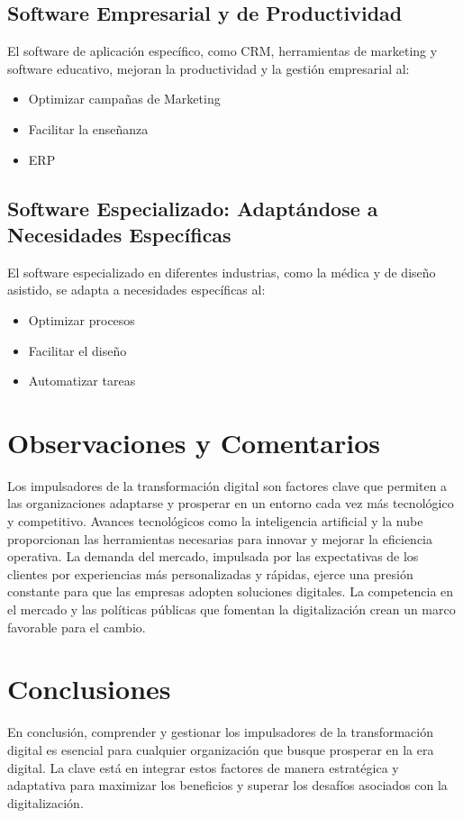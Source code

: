 \documentclass[12pt]{article}
\begin{document}
\subsection*{Software Empresarial y de Productividad}
El software de aplicación específico, como CRM, herramientas de marketing y software educativo, mejoran la productividad y la gestión empresarial al:
\begin{itemize}
\item  Optimizar campañas de Marketing
\item Facilitar la enseñanza
\item  ERP
\end{itemize}


\subsection*{Software Especializado: Adaptándose a Necesidades Específicas}
El software especializado en diferentes industrias, como la médica y de diseño asistido, se adapta a necesidades específicas al:
\begin{itemize}
\item  Optimizar procesos
\item Facilitar el diseño
\item  Automatizar tareas
\end{itemize}



\section*{Observaciones y Comentarios}
Los impulsadores de la transformación digital son factores clave que permiten a las organizaciones adaptarse y prosperar en un entorno cada vez más tecnológico y competitivo. Avances tecnológicos como la inteligencia artificial y la nube proporcionan las herramientas necesarias para innovar y mejorar la eficiencia operativa. La demanda del mercado, impulsada por las expectativas de los clientes por experiencias más personalizadas y rápidas, ejerce una presión constante para que las empresas adopten soluciones digitales. La competencia en el mercado y las políticas públicas que fomentan la digitalización crean un marco favorable para el cambio.

\section*{Conclusiones}
En conclusión, comprender y gestionar los impulsadores de la transformación digital es esencial para cualquier organización que busque prosperar en la era digital. La clave está en integrar estos factores de manera estratégica y adaptativa para maximizar los beneficios y superar los desafíos asociados con la digitalización.
\end{document}
